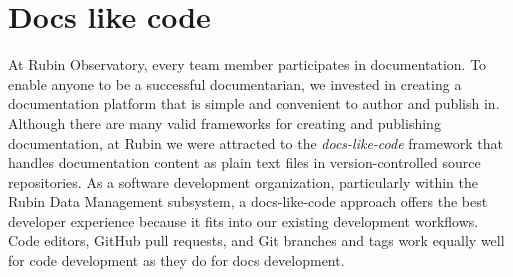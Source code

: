 \documentclass[11pt,twoside]{article}
\begin{document}



\section{Docs like code}


At Rubin Observatory, every team member participates in documentation.
To enable anyone to be a successful documentarian, we invested in creating a documentation platform that is simple and convenient to author and publish in.
Although there are many valid frameworks for creating and publishing documentation, at Rubin we were attracted to the \emph{docs-like-code} \citep{Gentle2022} framework that handles documentation content as plain text files in version-controlled source repositories.
As a software development organization, particularly within the Rubin Data Management subsystem, a docs-like-code approach offers the best developer experience because it fits into our existing development workflows.
Code editors, GitHub pull requests, and Git branches and tags work equally well for code development as they do for docs development.
\end{document}
